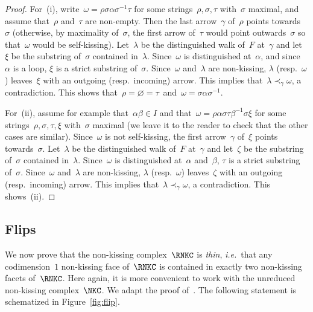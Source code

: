 \documentclass{memo-l}
\theoremstyle{definition}
\newcommand{\fref}[1]{Figure~\ref{#1}} %
\newcommand{\ie}{\textit{i.e.}~} %
\newcommand{\darkblue}{\color{darkblue}} %
\newcommand{\defn}[1]{\textsl{\darkblue #1}} %
\begin{document}
\begin{proof}
For~(i), write~$\omega = \rho \sigma \alpha \sigma^{-1} \tau$ for some strings~$\rho, \sigma, \tau$ with~$\sigma$ maximal, and assume that~$\rho$ and~$\tau$ are non-empty.
Then the last arrow~$\gamma$ of~$\rho$ points towards~$\sigma$ (otherwise, by maximality of~$\sigma$, the first arrow of~$\tau$ would point outwards~$\sigma$ so that~$\omega$ would be self-kissing).
Let~$\lambda$ be the distinguished walk of~$F$ at~$\gamma$ and let~$\xi$ be the substring of~$\sigma$ contained in~$\lambda$.
Since~$\omega$ is distinguished at~$\alpha$, and since~$\alpha$ is a loop, $\xi$ is a strict substring of~$\sigma$.
Since~$\omega$ and~$\lambda$ are non-kissing, $\lambda$ (resp.~$\omega$) leaves~$\xi$ with an outgoing (resp.~incoming) arrow.
This implies that~$\lambda \prec_\gamma \omega$, a contradiction.
This shows that~$\rho = \varnothing = \tau$~and~$\omega = \sigma \alpha \sigma^{-1}$.

For~(ii), assume for example that~$\alpha\beta \in I$ and that~$\omega = \rho \alpha \sigma \tau \beta^{-1} \sigma \xi$ for some strings~$\rho, \sigma, \tau, \xi$ with~$\sigma$ maximal (we leave it to the reader to check that the other cases are similar).
Since~$\omega$ is not self-kissing, the first arrow~$\gamma$ of~$\xi$ points towards~$\sigma$.
Let~$\lambda$ be the distinguished walk of~$F$ at~$\gamma$ and let~$\zeta$ be the substring of~$\sigma$ contained in~$\lambda$.
Since~$\omega$ is distinguished at~$\alpha$ and~$\beta$, $\tau$ is a strict substring of~$\sigma$.
Since~$\omega$ and~$\lambda$ are non-kissing, $\lambda$ (resp.~$\omega$) leaves~$\zeta$ with an outgoing (resp.~incoming) arrow.
This implies that~$\lambda \prec_\gamma \omega$, a contradiction.
This shows~(ii).
\end{proof}

\subsection{Flips}
\label{subsec:flips}

We now prove that the non-kissing complex~$\RNKC$ is \defn{thin}, \ie that any codimension~$1$ non-kissing face of~$\RNKC$ is contained in exactly two non-kissing facets of~$\RNKC$.
Here again, it is more convenient to work with the unreduced non-kissing complex~$\NKC$.
We adapt the proof of~\cite[Thm~3.2\,(3)]{McConville}.
The following statement is schematized in \fref{fig:flip}.
\end{document}

